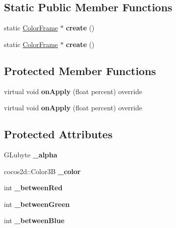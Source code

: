 \subsection*{Static Public Member Functions}
\begin{DoxyCompactItemize}
\item 
\mbox{\label{classColorFrame_afca1653f06a68fa9df55a580cbad387b}} 
static \hyperlink{classColorFrame}{Color\+Frame} $\ast$ {\bfseries create} ()
\item 
\mbox{\label{classColorFrame_a7d4d35c75434c617fab6ac70e4c34cde}} 
static \hyperlink{classColorFrame}{Color\+Frame} $\ast$ {\bfseries create} ()
\end{DoxyCompactItemize}
\subsection*{Protected Member Functions}
\begin{DoxyCompactItemize}
\item 
\mbox{\label{classColorFrame_a7e7199592c1813440367bda8e4908c07}} 
virtual void {\bfseries on\+Apply} (float percent) override
\item 
\mbox{\label{classColorFrame_aba167a9eac83e1924fb198bf5b2dd9a7}} 
virtual void {\bfseries on\+Apply} (float percent) override
\end{DoxyCompactItemize}
\subsection*{Protected Attributes}
\begin{DoxyCompactItemize}
\item 
\mbox{\label{classColorFrame_a6a3b56d268027e8f11c2177250ebd256}} 
G\+Lubyte {\bfseries \+\_\+alpha}
\item 
\mbox{\label{classColorFrame_a51f71f9a28e68336ff874ecd997a0bb0}} 
cocos2d\+::\+Color3B {\bfseries \+\_\+color}
\item 
\mbox{\label{classColorFrame_a5d588bcf60890a30536d140ad7fcbaf8}} 
int {\bfseries \+\_\+between\+Red}
\item 
\mbox{\label{classColorFrame_a4a2a5535519ead59377bf5a28676f0ab}} 
int {\bfseries \+\_\+between\+Green}
\item 
\mbox{\label{classColorFrame_a8b6f26e773cc1c2367600902095e0547}} 
int {\bfseries \+\_\+between\+Blue}
\end{DoxyCompactItemize}


